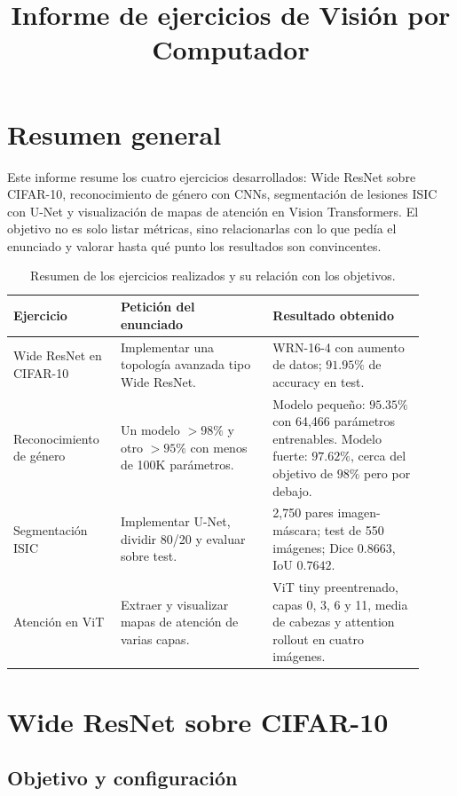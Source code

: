 \documentclass[a4paper,11pt]{article}
\title{Informe de ejercicios de Visión por Computador}
\author{}
\date{}
\begin{document}
\maketitle

\section{Resumen general}

Este informe resume los cuatro ejercicios desarrollados: Wide ResNet sobre CIFAR-10, reconocimiento de género con CNNs, segmentación de lesiones ISIC con U-Net y visualización de mapas de atención en Vision Transformers. El objetivo no es solo listar métricas, sino relacionarlas con lo que pedía el enunciado y valorar hasta qué punto los resultados son convincentes.

\begin{table}[H]
\centering
\begin{tabular}{p{0.24\linewidth} p{0.34\linewidth} p{0.34\linewidth}}
\toprule
\textbf{Ejercicio} & \textbf{Petición del enunciado} & \textbf{Resultado obtenido} \\
\midrule
Wide ResNet en CIFAR-10 & Implementar una topología avanzada tipo Wide ResNet. & WRN-16-4 con aumento de datos; \(91.95\%\) de accuracy en test. \\
Reconocimiento de género & Un modelo \(>98\%\) y otro \(>95\%\) con menos de 100K parámetros. & Modelo pequeño: \(95.35\%\) con 64,466 parámetros entrenables. Modelo fuerte: \(97.62\%\), cerca del objetivo de \(98\%\) pero por debajo. \\
Segmentación ISIC & Implementar U-Net, dividir 80/20 y evaluar sobre test. & 2,750 pares imagen-máscara; test de 550 imágenes; Dice \(0.8663\), IoU \(0.7642\). \\
Atención en ViT & Extraer y visualizar mapas de atención de varias capas. & ViT tiny preentrenado, capas 0, 3, 6 y 11, media de cabezas y attention rollout en cuatro imágenes. \\
\bottomrule
\end{tabular}
\caption{Resumen de los ejercicios realizados y su relación con los objetivos.}
\end{table}

\section{Wide ResNet sobre CIFAR-10}

\subsection{Objetivo y configuración}
\end{document}
